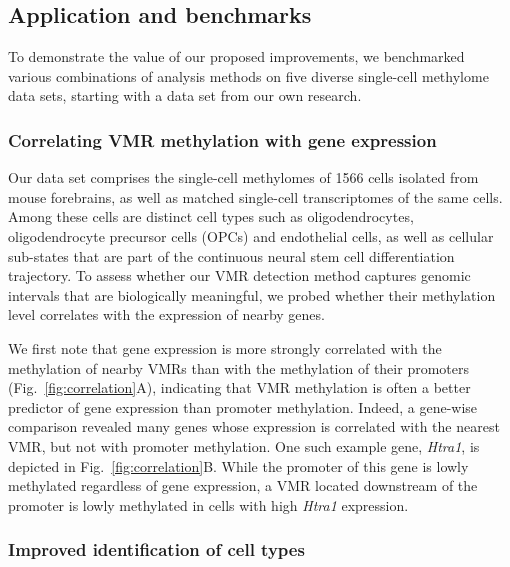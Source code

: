 \documentclass[twocolumn,10pt]{article}
\newcommand{\new}[1]{#1} %
\begin{document}
\subsection{Application and benchmarks}

To demonstrate the value of our proposed improvements, we benchmarked various combinations of analysis methods on \new{five diverse single-cell methylome data sets, starting with a data set from our own research}.

\subsubsection{Correlating VMR methylation with gene expression}

Our data set \citep{kremer_scnmt} comprises the single-cell methylomes of 1566 cells isolated from mouse forebrains, as well as matched single-cell transcriptomes of the same cells.
Among these cells are distinct cell types such as oligodendrocytes, oligodendrocyte precursor cells (OPCs) and endothelial cells, as well as cellular sub-states that are part of the continuous neural stem cell differentiation trajectory.
To assess whether our VMR detection method captures genomic intervals that are biologically meaningful, we probed whether their methylation level correlates with the expression of nearby genes.

We first note that gene expression is more strongly correlated with the methylation of nearby VMRs than with the methylation of their promoters (Fig.~\ref{fig:correlation}A), indicating that VMR methylation is often a better predictor of gene expression than promoter methylation.
Indeed, a gene-wise comparison revealed many genes whose expression is correlated with the nearest VMR, but not with promoter methylation.
One such example gene, \textit{Htra1}, is depicted in Fig.~\ref{fig:correlation}B.
While the promoter of this gene is lowly methylated regardless of gene expression, a VMR located downstream of the promoter is lowly methylated in cells with high \textit{Htra1} expression.

\subsubsection{Improved identification of cell types}
\end{document}
